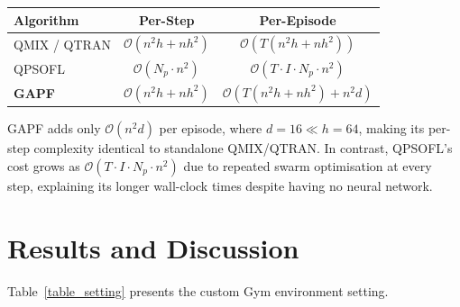 \documentclass[12pt, onecolumn, journal]{IEEEtran}
\begin{document}
\begin{center}
\label{tab:complexity}
\begin{tabular}{lcc}
\toprule
Algorithm & Per-Step & Per-Episode \\
\midrule
QMIX / QTRAN & $\mathcal{O}(n^2 h + n h^2)$ & $\mathcal{O}(T(n^2 h + n h^2))$ \\
QPSOFL  & $\mathcal{O}(N_p \cdot n^2)$ & $\mathcal{O}(T \cdot I \cdot N_p \cdot n^2)$ \\
\textbf{GAPF} & $\mathcal{O}(n^2 h + n h^2)$ & $\mathcal{O}(T(n^2 h + n h^2) + n^2 d)$ \\
\bottomrule
\end{tabular}
\end{center}

\noindent GAPF adds only $\mathcal{O}(n^2 d)$ per episode, where $d = 16 \ll h = 64$, making its per-step complexity identical to standalone QMIX/QTRAN. In contrast, QPSOFL's cost grows as $\mathcal{O}(T \cdot I \cdot N_p \cdot n^2)$ due to repeated swarm optimisation at every step, explaining its longer wall-clock times despite having no neural network.



\section{Results and Discussion}

Table~\ref{table_setting} presents the custom Gym environment setting.

\begin{center}
\label{table_setting}
\end{center}
\end{document}
